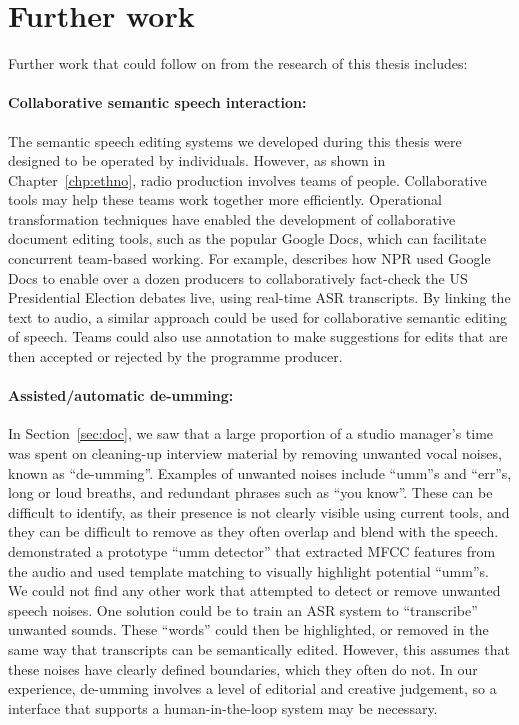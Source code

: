 \section{Further work}

Further work that could follow on from the research of this thesis includes:

\paragraph{Collaborative semantic speech interaction:}

The semantic speech editing systems we developed during this thesis were designed to be operated by individuals.
However, as shown in Chapter~\ref{chp:ethno}, radio production involves teams of people.  Collaborative tools may help
these teams work together more efficiently.  Operational transformation techniques \citep{Sun2004} have enabled the
development of collaborative document editing tools, such as the popular Google Docs, which can facilitate concurrent
team-based working.  For example, \citet{Fisher2016} describes how NPR used Google Docs to enable over a dozen
producers to collaboratively fact-check the US Presidential Election debates live, using real-time ASR transcripts. By
linking the text to audio, a similar approach could be used for collaborative semantic editing of speech. Teams could
also use annotation to make suggestions for edits that are then accepted or rejected by the programme producer.

\paragraph{Assisted/automatic de-umming:}

In Section~\ref{sec:doc}, we saw that a large proportion of a studio manager's time was spent on cleaning-up interview
material by removing unwanted vocal noises, known as ``de-umming''. Examples of unwanted noises include ``umm''s and
``err''s, long or loud breaths, and redundant phrases such as ``you know''.  These can be difficult to identify, as
their presence is not clearly visible using current tools, and they can be difficult to remove as they often overlap
and blend with the speech. \citet{Loviscach2013} demonstrated a prototype ``umm detector'' that extracted MFCC
\citep{Imai1983} features from the audio and used template matching to visually highlight potential ``umm''s. We could
not find any other work that attempted to detect or remove unwanted speech noises.  One solution could be to train an
ASR system to ``transcribe'' unwanted sounds. These ``words'' could then be highlighted, or removed in the same way
that transcripts can be semantically edited.  However, this assumes that these noises have clearly defined boundaries,
which they often do not.  In our experience, de-umming involves a level of editorial and creative judgement, so a
interface that supports a human-in-the-loop system may be necessary.

